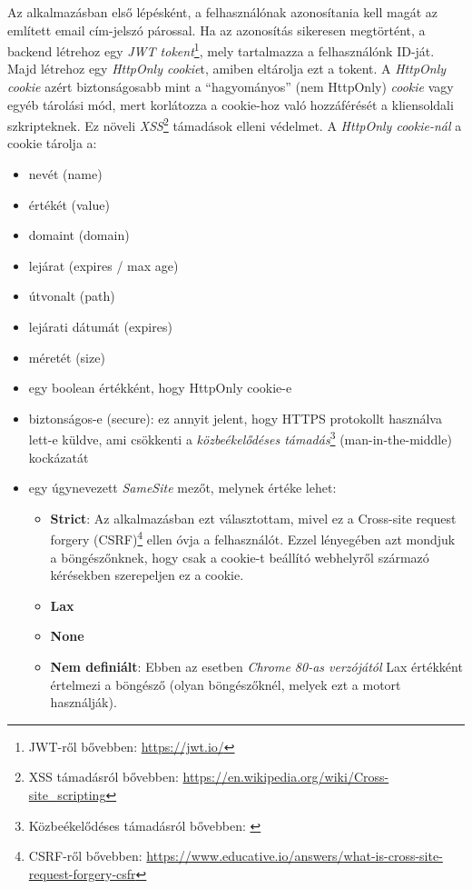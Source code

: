 \documentclass[
]{thesis-ekf}
\theoremstyle{definition}
\theoremstyle{remark}
\begin{document}
Az alkalmazásban első lépésként, a felhasználónak azonosítania kell magát az említett email cím-jelszó párossal. Ha az azonosítás sikeresen megtörtént, a backend létrehoz egy \emph{JWT tokent}\footnote{JWT-ről bővebben: \url{https://jwt.io/}}, mely tartalmazza a felhasználónk ID-ját. Majd létrehoz egy \emph{HttpOnly cookie}t, amiben eltárolja ezt a tokent. A \emph{HttpOnly cookie} azért biztonságosabb mint a ``hagyományos'' (nem HttpOnly) \emph{cookie} vagy egyéb tárolási mód, mert korlátozza a cookie-hoz való hozzáférését a kliensoldali szkripteknek. Ez növeli \emph{XSS}\footnote{XSS támadásról bővebben: \url{https://en.wikipedia.org/wiki/Cross-site_scripting}} támadások elleni védelmet. A \emph{HttpOnly cookie-nál} a cookie tárolja a:
\begin{itemize}
	\item nevét (name)
	\item értékét (value)
	\item domaint (domain)
	\item lejárat (expires / max age)
	\item útvonalt (path)
	\item lejárati dátumát (expires)
	\item méretét (size)
	\item egy boolean értékként, hogy HttpOnly cookie-e
	\item biztonságos-e (secure): ez annyit jelent, hogy HTTPS protokollt használva lett-e küldve, ami csökkenti a \emph{közbeékelődéses támadás}\footnote{Közbeékelődéses támadásról bővebben: \cite{wiki-kozbeekelodeses-tamadas}} (man-in-the-middle) kockázatát
	\item egy úgynevezett \emph{SameSite} mezőt, melynek értéke lehet: 
		\begin{itemize}
			\item \textbf{Strict}: Az alkalmazásban ezt választottam, mivel ez a Cross-site request forgery (CSRF)\footnote{CSRF-ről bővebben: \url{https://www.educative.io/answers/what-is-cross-site-request-forgery-csfr}} ellen óvja a felhasználót. Ezzel lényegében azt mondjuk a böngészőnknek, hogy csak a cookie-t beállító webhelyről származó kérésekben szerepeljen ez a cookie. 
			\item \textbf{Lax}
			\item \textbf{None}
			\item \textbf{Nem definiált}: Ebben az esetben \emph{Chrome 80-as verzójától} Lax értékként értelmezi a böngésző (olyan böngészőknél, melyek ezt a motort használják).
		\end{itemize} 
\end{itemize}
\end{document}
